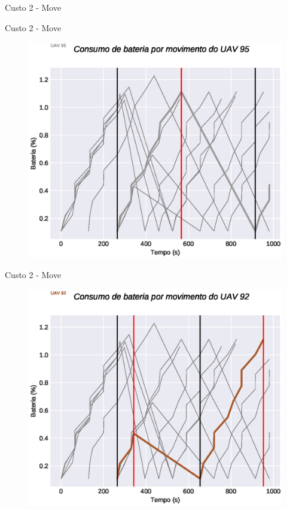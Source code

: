 \begin{frame}{Custo 2 - Move}
\begin{figure}[!htb]
                 \end{figure}
            \end{frame}\begin{frame}{Custo 2 - Move}
                \begin{figure}[!htb]
                     \includegraphics[width=\textwidth]{custo_2/uav_move_acum_uav_9.eps}
                 \end{figure}
            \end{frame}\begin{frame}{Custo 2 - Move}
                \begin{figure}[!htb]
                     \includegraphics[width=\textwidth]{custo_2/uav_move_acum_uav_6.eps}

\end{figure}
\end{frame}
